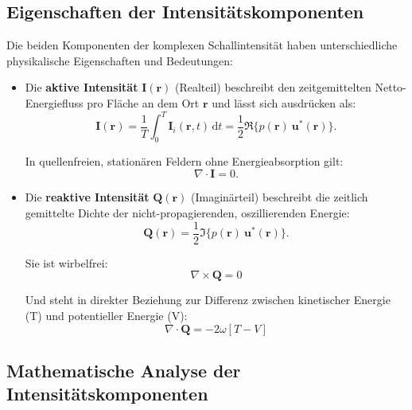 \subsection{Eigenschaften der Intensitätskomponenten
\label{helmholtz:subsection:def_Schallintensitaet}}

Die beiden Komponenten der komplexen Schallintensität haben unterschiedliche physikalische Eigenschaften und Bedeutungen:

\begin{itemize}
\item Die \textbf{aktive Intensität} $\mathbf{I}(\mathbf{r})$ (Realteil) beschreibt den zeitgemittelten Netto-Energiefluss pro Fläche an dem Ort $\mathbf{r}$ und lässt sich ausdrücken als:
\begin{equation}
\mathbf{I}(\mathbf{r}) = \frac{1}{T}\int_0^T \mathbf{I}_i(\mathbf{r},t)\,\mathrm{d}t = \frac{1}{2}\Re\{p(\mathbf{r})~\mathbf{u}^*(\mathbf{r})\}.
\end{equation}

\noindent In quellenfreien, stationären Feldern ohne Energieabsorption gilt:
\begin{equation}
\nabla \cdot \mathbf{I} = 0.
\end{equation}

\item Die \textbf{reaktive Intensität} $\mathbf{Q}(\mathbf{r})$ (Imaginärteil) beschreibt die zeitlich gemittelte Dichte der nicht-propagierenden, oszillierenden Energie: 
\begin{equation}
\mathbf{Q}(\mathbf{r}) = \frac{1}{2}\Im\{p(\mathbf{r})~\mathbf{u}^*(\mathbf{r})\}.
\label{helmholtz:equationReaktiveIntensitaet}
\end{equation}

\noindent Sie ist wirbelfrei:
\begin{equation}
\nabla \times \mathbf{Q} = 0
\end{equation}

\noindent Und steht in direkter Beziehung zur Differenz zwischen kinetischer Energie (T) und potentieller Energie (V):
\begin{equation}
\nabla \cdot \mathbf{Q} = -2 \omega [T-V]
\end{equation}
\end{itemize}


\subsection{Mathematische Analyse der Intensitätskomponenten
\label{helmholtz:subsection:def_Schallintensitaet}}

